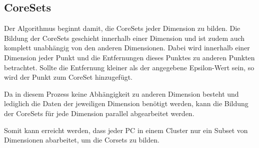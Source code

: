 \subsection{CoreSets}

Der Algorithmus beginnt damit, die CoreSets jeder Dimension zu bilden. Die Bildung der CoreSets
geschieht innerhalb einer Dimension und ist zudem auch komplett unabhängig von den anderen
Dimensionen. Dabei wird innerhalb einer Dimension jeder Punkt und die Entfernungen
dieses Punktes zu anderen Punkten betrachtet. Sollte die Entfernung kleiner als der angegebene Epsilon-Wert sein, so
wird der Punkt zum CoreSet hinzugefügt.

Da in diesem Prozess keine Abhängigkeit zu anderen Dimension besteht und lediglich
die Daten der jeweiligen Dimension benötigt werden, kann die Bildung der CoreSets für jede
Dimension parallel abgearbeitet werden.

Somit kann erreicht werden, dass jeder PC in einem Cluster nur ein Subset von Dimensionen
abarbeitet, um die Corsets zu bilden.